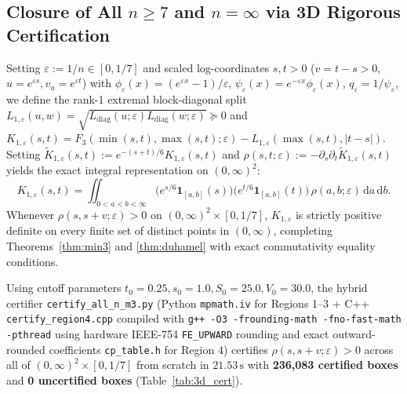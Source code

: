\documentclass[11pt,a4paper]{article}
\theoremstyle{remark}
\begin{document}
\subsection{Closure of All $n\ge 7$ and $n=\infty$ via 3D Rigorous Certification}
Setting $\varepsilon := 1/n \in [0,1/7]$ and scaled log-coordinates $s,t>0$ ($v=t-s>0$, $u=e^{\varepsilon s}, v_u=e^{\varepsilon t}$) with $\phi_\varepsilon(x)=(e^{\varepsilon x}-1)/\varepsilon$, $\psi_\varepsilon(x)=e^{-\varepsilon x}\phi_\varepsilon(x)$, $q_\varepsilon=1/\psi_\varepsilon$, we define the rank-1 extremal block-diagonal split $L_{1,\varepsilon}(u,w) = \sqrt{L_{\mathrm{diag}}(u;\varepsilon)L_{\mathrm{diag}}(w;\varepsilon)}\succeq 0$ and $K_{1,\varepsilon}(s,t) = F_3(\min(s,t),\max(s,t);\varepsilon) - L_{1,\varepsilon}(\max(s,t),|t-s|)$. Setting $\tilde{K}_{1,\varepsilon}(s,t) := e^{-(s+t)/6}K_{1,\varepsilon}(s,t)$ and $\rho(s,t;\varepsilon) := -\partial_s\partial_t\tilde{K}_{1,\varepsilon}(s,t)$ yields the exact integral representation on $(0,\infty)^2$:
\[
K_{1,\varepsilon}(s,t) = \iint_{0<a<b<\infty} \Big(e^{s/6}\mathbf{1}_{[a,b]}(s)\Big)\Big(e^{t/6}\mathbf{1}_{[a,b]}(t)\Big)\,\rho(a,b;\varepsilon)\,\mathrm{d}a\,\mathrm{d}b.
\]
Whenever $\rho(s,s+v;\varepsilon)>0$ on $(0,\infty)^2\times[0,1/7]$, $K_{1,\varepsilon}$ is strictly positive definite on every finite set of distinct points in $(0,\infty)$, completing Theorems~\ref{thm:min3} and \ref{thm:duhamel} with exact commutativity equality conditions.

Using cutoff parameters $t_0=0.25, s_0=1.0, S_0=25.0, V_0=30.0$, the hybrid certifier \texttt{certify\_all\_n\_m3.py} (Python \texttt{mpmath.iv} for Regions 1--3 + C++ \texttt{certify\_region4.cpp} compiled with \texttt{g++ -O3 -frounding-math -fno-fast-math -pthread} using hardware IEEE-754 \texttt{FE\_UPWARD} rounding and exact outward-rounded coefficients \texttt{cp\_table.h} for Region 4) certifies $\rho(s,s+v;\varepsilon)>0$ across all of $(0,\infty)^2\times[0,1/7]$ from scratch in \textbf{$21.53\,\mathrm{s}$} with \textbf{236,083 certified boxes} and \textbf{0 uncertified boxes} (Table~\ref{tab:3d_cert}).
\end{document}
